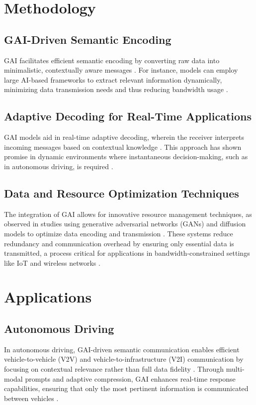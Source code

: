 \documentclass[journal]{IEEEtran}
\begin{document}
\section{Methodology}

\subsection{GAI-Driven Semantic Encoding}
GAI facilitates efficient semantic encoding by converting raw data into minimalistic, contextually aware messages \cite{chaccour2022dataknowledgebuildinggeneration}. For instance, models can employ large AI-based frameworks to extract relevant information dynamically, minimizing data transmission needs and thus reducing bandwidth usage \cite{10634888,10614204}.

\subsection{Adaptive Decoding for Real-Time Applications}
GAI models aid in real-time adaptive decoding, wherein the receiver interprets incoming messages based on contextual knowledge \cite{10614204}. This approach has shown promise in dynamic environments where instantaneous decision-making, such as in autonomous driving, is required \cite{10447237}.

\subsection{Data and Resource Optimization Techniques}
The integration of GAI allows for innovative resource management techniques, as observed in studies using generative adversarial networks (GANs) and diffusion models to optimize data encoding and transmission \cite{liu2024semanticcommunicationsartificialintelligence}. These systems reduce redundancy and communication overhead by ensuring only essential data is transmitted, a process critical for applications in bandwidth-constrained settings like IoT and wireless networks \cite{9797984,9953099}.

\section{Applications}

\subsection{Autonomous Driving}
In autonomous driving, GAI-driven semantic communication enables efficient vehicle-to-vehicle (V2V) and vehicle-to-infrastructure (V2I) communication by focusing on contextual relevance rather than full data fidelity \cite{raha2023generativeaidrivensemanticcommunication}. Through multi-modal prompts and adaptive compression, GAI enhances real-time response capabilities, ensuring that only the most pertinent information is communicated between vehicles \cite{10447237}.
\end{document}
